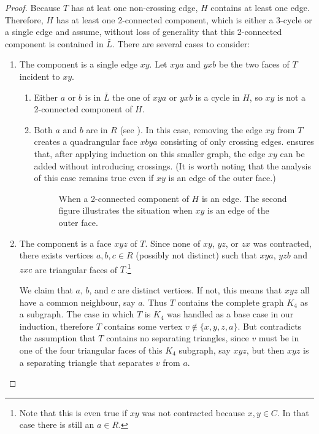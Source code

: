 \documentclass{patmorin}
\begin{document}
\begin{proof}
   Because $T$ has at leat one non-crossing edge, $H$ contains at least one
   edge.  Therefore, $H$ has at least one 2-connected component, 
   which is either a 3-cycle
   or a single edge and assume, without loss of generality that this
   2-connected component is contained in $\bar L$.  
   There are several cases to consider:
   \begin{enumerate}
	\item The component is a single edge $xy$.  Let $xya$ and $yxb$
	be the two faces of $T$ incident to $xy$.
        \begin{enumerate}
            \item Either $a$ or $b$ is in $\bar L$ the one of $xya$
            or $yxb$ is a cycle in $H$, so $xy$ is not a 2-connected
            component of $H$.
            \item Both $a$ and $b$ are in $R$ (see ).  In this
            case, removing the edge $xy$ from $T$ creates a quadrangular
            face $xbya$ consisting of only crossing edges. 
            ensures that, after applying induction on this smaller graph,
            the edge $xy$ can be added without introducing crossings.
            (It is worth noting that the analysis of this case remains
            true even if $xy$ is an edge of the outer face.)
            \begin{figure}
               \caption{When a 2-connected component of $H$ is an edge. The second figure illustrates the situation when $xy$ is an edge of the outer face.}
            \end{figure}
        \end{enumerate}
        \item The component is a face $xyz$ of $T$.  Since none of $xy$,
        $yz$, or $zx$ was contracted, there exists vertices $a,b,c\in R$
        (possibly not distinct) such that $xya$, $yzb$ and $zxc$ are
        triangular faces of $T$.\footnote{Note that this is even true if
        $xy$ was not contracted because $x,y\in C$. In that case there
        is still an $a\in R$.} 

        We claim that $a$, $b$, and $c$ are distinct vertices. If not,
        this means that $xyz$ all have a common neighbour, say $a$. Thus
        $T$ contains the complete graph $K_4$ as a subgraph.  The case in
        which $T$ is $K_4$ was handled as a base case in our induction,
        therefore $T$ contains some vertex $v\not\in\{x,y,z,a\}$. But
        contradicts the assumption that $T$ contains no separating
        triangles, since $v$ must be in one of the four triangular faces
        of this $K_4$ subgraph, say $xyz$, but then $xyz$ is a separating
        triangle that separates $v$ from $a$.


\end{enumerate}
\end{proof}
\end{document}
